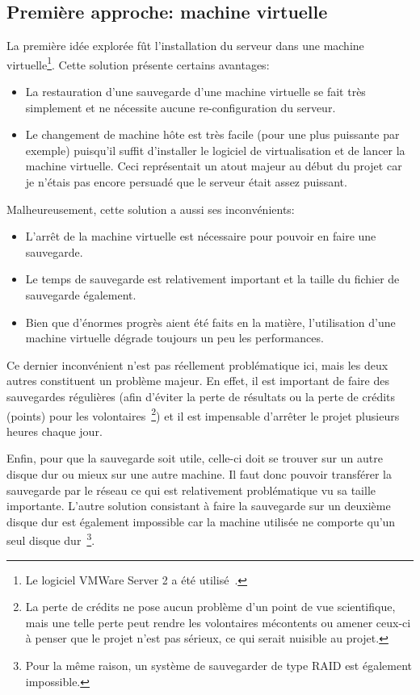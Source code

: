\documentclass[a4paper, 12pt]{report}
\begin{document}
\subsection{Première approche: machine virtuelle}
La première idée explorée fût l'installation du serveur dans une machine virtuelle\footnote{Le logiciel VMWare Server 2 a été utilisé~\cite{VMWARE}.}.
Cette solution présente certains avantages:
\begin{itemize}
\item La restauration d'une sauvegarde d'une machine virtuelle se fait très simplement et ne nécessite aucune re-configuration du serveur.
\item Le changement de machine hôte est très facile (pour une plus puissante par exemple) puisqu'il suffit d'installer le logiciel de virtualisation et de lancer la machine virtuelle. Ceci représentait un atout majeur au début du projet car je n'étais pas encore persuadé que le serveur était assez puissant.
\end{itemize}
\newpage
Malheureusement, cette solution a aussi ses inconvénients:
\begin{itemize}
\item L'arrêt de la machine virtuelle est nécessaire pour pouvoir en faire une sauvegarde.
\item Le temps de sauvegarde est relativement important et la taille du fichier de sauvegarde également.
\item Bien que d'énormes progrès aient été faits en la matière, l'utilisation d'une machine virtuelle dégrade toujours un peu les performances.
\end{itemize}
Ce dernier inconvénient n'est pas réellement problématique ici, mais les deux autres constituent un problème majeur. En effet, il est important de faire des sauvegardes régulières (afin d'éviter la perte de résultats ou la perte de crédits (points) pour les volontaires~\footnote{La perte de crédits ne pose aucun problème d'un point de vue scientifique, mais une telle perte peut rendre les volontaires mécontents ou amener ceux-ci à penser que le projet n'est pas sérieux, ce qui serait nuisible au projet.}) et il est impensable d'arrêter le projet plusieurs heures chaque jour.

Enfin, pour que la sauvegarde soit utile, celle-ci doit se trouver sur un autre disque dur ou mieux sur une autre machine. Il faut donc pouvoir transférer la sauvegarde par le réseau ce qui est relativement problématique vu sa taille importante. L'autre solution consistant à faire la sauvegarde sur un deuxième disque dur est également impossible car la machine utilisée ne comporte qu'un seul disque dur~\footnote{Pour la même raison, un système de sauvegarder de type RAID est également impossible.}. 
\end{document}

